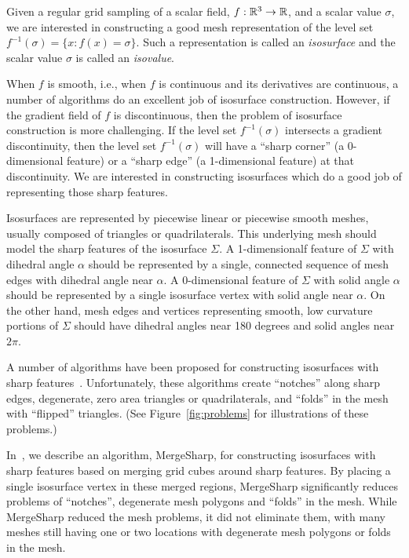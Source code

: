 

\maketitle

Given a regular grid sampling of a scalar field, $f: \mathbb{R}^{3} \rightarrow \mathbb{R}$,
and a scalar value $\sigma$,
we are interested in constructing a good mesh representation
of the level set $f^{-1}(\sigma) = \{x : f(x) = \sigma \}$.
Such a representation is called an {\em isosurface} 
and the scalar value $\sigma$ is called an {\em isovalue}.

When $f$ is smooth,
i.e., when $f$ is continuous and its derivatives are continuous,
a number of algorithms do an excellent job of isosurface construction.
However, if the gradient field of $f$ is discontinuous,
then the problem of isosurface construction is more challenging.
If the level set $f^{-1}(\sigma)$ intersects a gradient discontinuity,
then the level set $f^{-1}(\sigma)$ will have a ``sharp corner''
(a 0-dimensional feature) or a ``sharp edge'' (a 1-dimensional feature)
at that discontinuity.
We are interested in constructing isosurfaces
which do a good job of representing those sharp features.

Isosurfaces are represented by piecewise linear or piecewise smooth meshes,
usually composed of triangles or quadrilaterals.
This underlying mesh should model the sharp features
of the isosurface $\Sigma$.
A 1-dimensionalf feature of $\Sigma$ with dihedral angle $\alpha$
should be represented by a single, 
connected sequence of mesh edges with dihedral angle near $\alpha$.
A 0-dimensional feature of $\Sigma$ with solid angle $\alpha$
should be represented by a single
isosurface vertex with solid angle near $\alpha$.
On the other hand, mesh edges and vertices
representing smooth, low curvature portions of $\Sigma$ should have
dihedral angles near 180 degrees and solid angles near $2 \pi$.

A number of algorithms have been proposed
for constructing isosurfaces 
with sharp features~\cite{ab-fpmmo-03,gk-eretm-04,hwco-cmsaf-05,
jlsw-dchd-02,kbsh-fssev-01,ms-ispmg-10,Varadhan:2003:fss,
sw-dmcpc-04,zhk-dctps-04}.
Unfortunately, these algorithms create ``notches'' along sharp edges,
degenerate, zero area triangles or quadrilaterals,
and ``folds'' in the mesh with ``flipped'' triangles.
(See Figure~\ref{fig:problems}
for illustrations of these problems.)

In~\cite{bw-cisec-13},
we describe an algorithm, MergeSharp,
for constructing isosurfaces with sharp features
based on merging grid cubes around sharp features.
By placing a single isosurface vertex in these merged regions,
MergeSharp significantly reduces problems of ``notches'',
degenerate mesh polygons and ``folds'' in the mesh.
While MergeSharp reduced the mesh problems,
it did not eliminate them, 
with many meshes still having
one or two locations with degenerate mesh polygons or folds in the mesh.

